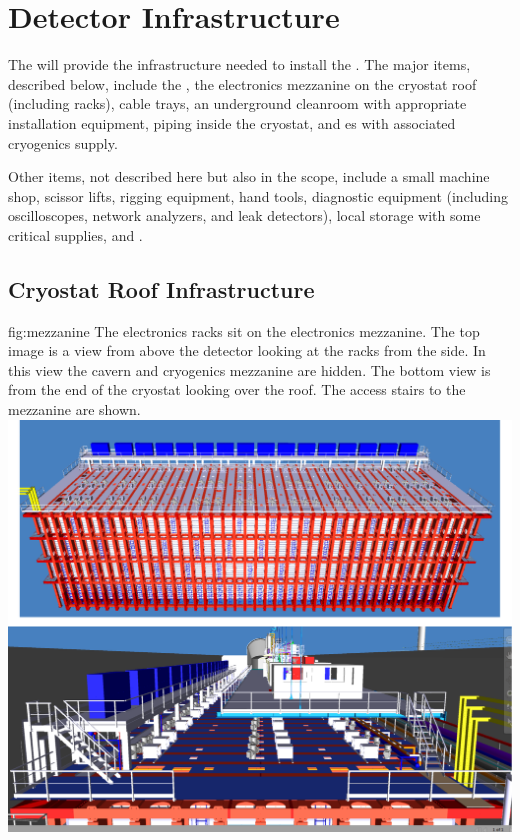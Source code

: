 \section{Detector Infrastructure}
\label{sec:fdsp-tc-infr}


The   will provide the infrastructure needed to install the . The major items, described below, include the , the electronics mezzanine on the cryostat roof (including racks), cable trays, an underground cleanroom with appropriate installation equipment, piping inside the cryostat, and \coldbox{}es with associated cryogenics supply. 

Other items, not described here but also in the  scope, include a small machine shop, scissor lifts, rigging equipment, hand tools, diagnostic equipment (including oscilloscopes, network analyzers, and leak detectors), local storage with some critical supplies, and .  



\subsection{Cryostat Roof Infrastructure}
\label{sec:fdsp-tc-infr-cryo-roof}

\begin{dunefigure}{fig:mezzanine}
  {The electronics racks sit on the  electronics mezzanine. The top image is a view from above the detector looking at the racks from the side. In this view the cavern and cryogenics mezzanine are hidden. The bottom view is from the end of the cryostat looking over the roof. The access stairs to the mezzanine are shown.}
 \includegraphics[width=\textwidth]{graphics/mezzanine.pdf}
\end{dunefigure}

